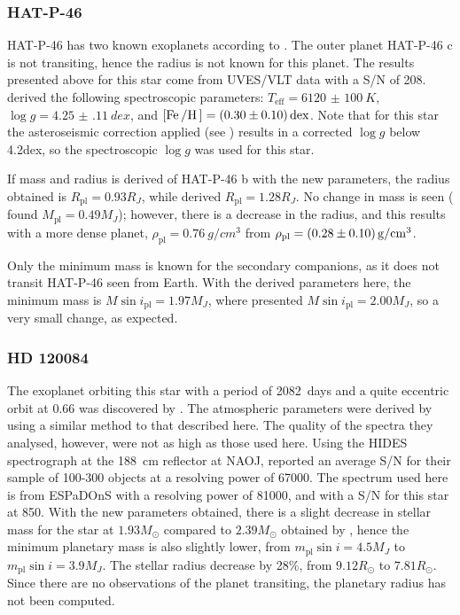 \subsubsection{HAT-P-46}
\label{sub:HAT-P-46}

HAT-P-46 has two known exoplanets according to \citet{Hartmann2014}. The outer planet HAT-P-46 c is
not transiting, hence the radius is not known for this planet. The results presented above for this
star come from UVES/VLT data with a S/N of 208. \citet{Hartmann2014} derived the following
spectroscopic parameters: $T_\mathrm{eff}=\SI{6120(100)}{K}$, $\log g=\SI{4.25(11)}{dex}$, and
$[\ion{Fe}/\ion{H}]=\SI{0.30(10)}{dex}$. Note that for this star the asteroseismic correction
applied (see ) results in a corrected $\log g$ below 4.2dex, so the
spectroscopic $\log g$ was used for this star.

If mass and radius is derived of HAT-P-46 b with the new parameters, the radius obtained is
$R_\mathrm{pl}=0.93R_J$, while \citet{Hartmann2014} derived $R_\mathrm{pl} = 1.28R_J$. No change in
mass is seen (\citealt{Hartmann2014} found $M_\mathrm{pl}=0.49M_J$); however, there is a decrease in
the radius, and this results with a more dense planet, $\rho_\mathrm{pl}=\SI{0.76}{g/cm^3}$ from
$\rho_\mathrm{pl}=\SI{0.28\pm0.10}{g/cm^3}$.

Only the minimum mass is known for the secondary companions, as it does not transit HAT-P-46 seen
from Earth. With the derived parameters here, the minimum mass is $M\sin i_\mathrm{pl} = 1.97M_J$,
where \citet{Hartmann2014} presented $M\sin i_\mathrm{pl} = 2.00M_J$, so a very small change, as
expected.


\subsubsection{HD 120084}
\label{sub:HD_120084}

The exoplanet orbiting this star with a period of \SI{2082}{days} and a quite eccentric orbit at
0.66 was discovered by \citet{Sato2013}. The atmospheric parameters were derived by
\citet{Takeda2008} using a similar method to that described here. The quality of the spectra they
analysed, however, were not as high as those used here. Using the HIDES spectrograph at the
\SI{188}{cm} reflector at NAOJ, \citet{Takeda2008} reported an average S/N for their sample of
100-300 objects at a resolving power of \num{67000}. The spectrum used here is from ESPaDOnS with a
resolving power of \num{81000}, and with a S/N for this star at 850. With the new parameters
obtained, there is a slight decrease in stellar mass for the star at $1.93M_\odot$ compared to
$2.39M_\odot$ obtained by \citet{Takeda2008}, hence the minimum planetary mass is also slightly
lower, from $m_\mathrm{pl}\sin i=4.5M_J$ to $m_\mathrm{pl}\sin i=3.9M_J$. The stellar radius
decrease by 28\%, from $9.12R_\odot$ to $7.81R_\odot$. Since there are no observations of the planet
transiting, the planetary radius has not been computed.



